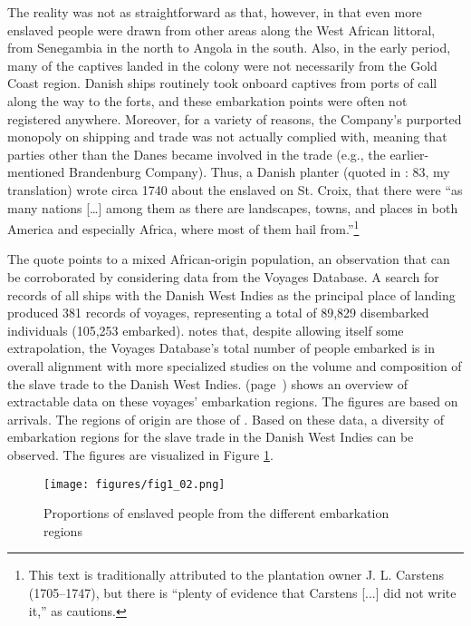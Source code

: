 \documentclass[output=paper,colorlinks,citecolor=brown]{langscibook}
\begin{document}
The reality was not as straightforward as that, however, in that even more enslaved people were drawn from other areas along the West African littoral, from Senegambia in the north to Angola in the south. Also, in the early period, many of the captives landed in the colony were not necessarily from the Gold Coast region. Danish ships routinely took onboard captives from ports of call along the way to the forts, and these embarkation points were often not registered anywhere. Moreover, for a variety of reasons, the Company’s purported monopoly on shipping and trade was not actually complied with, meaning that parties other than the Danes became involved in the trade (e.g., the earlier-mentioned Brandenburg Company). Thus, a Danish planter (quoted in \cite{Nielsen_1981}: 83, my translation) wrote circa 1740 about the enslaved on St. Croix, that there were ``as many nations [\ldots] among them as there are landscapes, towns, and places in both America and especially Africa, where most of them hail from.''\footnote{This text is traditionally attributed to the plantation owner J. L. Carstens (1705–1747), but there is ``plenty of evidence that Carstens [...] did not write it,'' as \citet[219]{Sebro_2016} cautions.} 

The quote points to a mixed African-origin population, an observation that can be corroborated by considering data from the Voyages Database. A search for records of all ships with the Danish West Indies as the principal place of landing produced 381 records of voyages, representing a total of 89,829 disembarked individuals (105,253 embarked). \citet[15]{Gobel_2016} notes that, despite allowing itself some extrapolation, the Voyages Database's total number of people embarked is in overall alignment with more specialized studies on the volume and composition of the slave trade to the Danish West Indies.  (page~\pageref{tab:tab1_02}) shows an overview of extractable data on these voyages’ embarkation regions. The figures are based on arrivals. The regions of origin are those of \citet{Eltis_Behrendt_Richardson_Klein_1999}. Based on these data, a diversity of embarkation regions for the slave trade in the Danish West Indies can be observed. The figures are visualized in Figure \ref{fig:fig1_02}.

\begin{figure}[!ht]
    \centering
    \texttt{[image: figures/fig1\_02.png]}
    \caption{Proportions of enslaved people from the different embarkation regions}
    \label{fig:fig1_02}
\end{figure}
\end{document}
